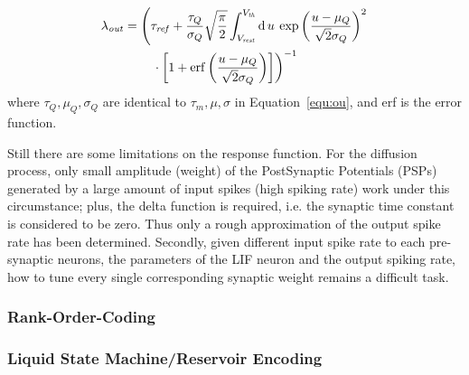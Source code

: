 \begin{align}
\lambda_\mathit{out} &=\left(\tau_\mathit{ref} + \frac{\tau_Q}{\sigma_Q}\sqrt{\frac{\pi}{2}} \int_{V_\mathit{rest}}^{V_\mathit{th}}\mathrm{d}\,u \:\exp \left(\frac{u-\mu_Q}{\sqrt2\sigma_Q} \right )^{2} \right. \nonumber \\
&\qquad \left. \vphantom{\int_t} \cdot  \left[1+\mathrm{erf} \left(\frac{u-\mu_Q}{\sqrt2\sigma_Q} \right ) \right ]\right)^{-1}
\label{equ:sgt}
\end{align}
where $\tau_Q, \mu_Q, \sigma_Q$ are identical to $\tau_m, \mu, \sigma$ in Equation~\ref{equ:ou}, and erf is the error function.

Still there are some limitations on the response function. 
For the diffusion process, only small amplitude (weight) of the PostSynaptic Potentials (PSPs) generated by a large amount of input spikes (high spiking rate) work under this circumstance; 
plus, the delta function is required, i.e. the synaptic time constant is considered to be zero. Thus only a rough approximation of the output spike rate has been determined.
Secondly, given different input spike rate to each pre-synaptic neurons, the parameters of the LIF neuron and the output spiking rate, how to tune every single corresponding synaptic weight remains a difficult task.

\subsubsection{Rank-Order-Coding}

\subsubsection{Liquid State Machine/Reservoir Encoding}

